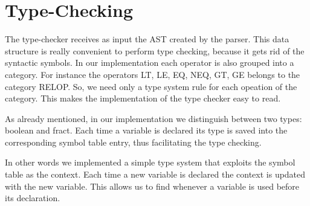 \section{Type-Checking}
\label{sec:type-checking}

The type-checker receives as input the AST created by the 
parser. This data structure is really convenient to perform
type checking, because it gets rid of the syntactic symbols.
In our implementation each operator is also grouped into a category.
For instance the operators LT, LE, EQ, NEQ, GT, GE belongs to the category 
RELOP. So, we need only a type system rule for each opeation of the category.
This makes the implementation of the type checker easy to read.


As already mentioned, in our implementation we distinguish between two types:
boolean and fract. Each time a variable is declared its type is saved into the 
corresponding symbol table entry, thus facilitating the type checking.

In other words we implemented a simple type system that exploits the symbol
table as the context. Each time a new variable is declared 
the context is updated with the new variable. This allows us to find whenever
a variable is used before its declaration.
